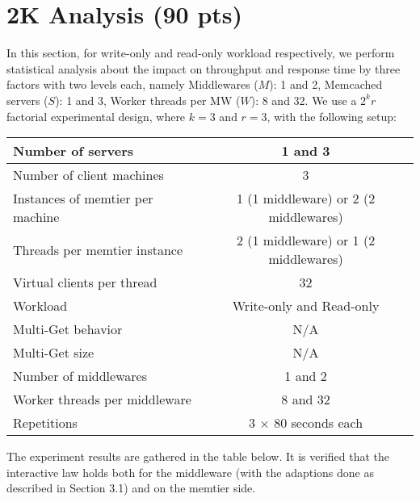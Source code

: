 \section{2K Analysis (90 pts)}

In this section, for write-only and read-only workload respectively, we perform statistical analysis about the impact on throughput and response time by three factors with two levels each, namely Middlewares ($M$): 1 and 2, Memcached servers ($S$): 1 and 3, Worker threads per MW ($W$): 8 and 32. We use a $2^{k}r$ factorial experimental design, where $k=3$ and $r=3$, with the following setup:

\begin{center}
	\scriptsize{
		\begin{tabular}{|l|c|}
			\hline Number of servers                & 1 and 3                                     \\ 
			\hline Number of client machines        & 3                                           \\ 
			\hline Instances of memtier per machine & 1 (1 middleware) or 2 (2 middlewares) \\ 
			\hline Threads per memtier instance     & 2 (1 middleware) or 1 (2 middlewares)   \\
			\hline Virtual clients per thread       &  32                                     \\ 
			\hline Workload                         & Write-only and Read-only\\
			\hline Multi-Get behavior               & N/A                                         \\
			\hline Multi-Get size                   & N/A                                         \\
			\hline Number of middlewares            & 1 and 2                                     \\
			\hline Worker threads per middleware    & 8 and 32                                    \\
			\hline Repetitions                      & 3 $\times$ 80 seconds each                  \\ 
			\hline 
		\end{tabular}
	} 
\end{center}

The experiment results are gathered in the table below. It is verified that the interactive law holds both for the middleware (with the adaptions done as described in Section 3.1) and on the memtier side.

